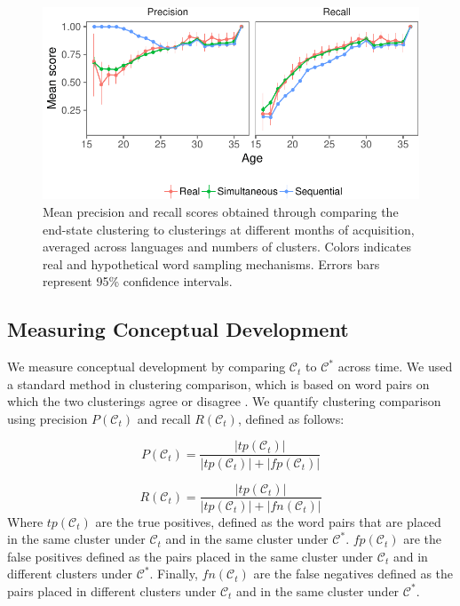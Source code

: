 \documentclass[11pt]{article}
\newenvironment{CodeChunk}{}{}
\begin{document}
\begin{CodeChunk}
\captionsetup{width=0.8\textwidth}\begin{figure}[h]

{\centering \includegraphics{figs/results-1} 

}

\caption[Mean precision and recall scores obtained through comparing the end-state clustering to clusterings at different months of acquisition, averaged across languages and numbers of clusters]{Mean precision and recall scores obtained through comparing the end-state clustering to clusterings at different months of acquisition, averaged across languages and numbers of clusters. Colors indicates real and hypothetical word sampling mechanisms. Errors bars represent 95\% confidence intervals.}\label{fig:results}
\end{figure}
\end{CodeChunk}

\subsection{Measuring Conceptual
Development}\label{measuring-conceptual-development}

We measure conceptual development by comparing \(\mathcal{C}_t\) to
\(\mathcal{C}^*\) across time. We used a standard method in clustering
comparison, which is based on word pairs on which the two clusterings
agree or disagree \cite{rand1971,hubert1985}. We quantify clustering
comparison using precision \(P(\mathcal{C}_t)\) and recall
\(R(\mathcal{C}_t)\), defined as follows:

\[
P(\mathcal{C}_t) = \frac{|tp(\mathcal{C}_t)|}{|tp(\mathcal{C}_t)| + |fp(\mathcal{C}_t)|}
\]

\[
R(\mathcal{C}_t) = \frac{|tp(\mathcal{C}_t)|}{|tp(\mathcal{C}_t)| + |fn(\mathcal{C}_t)|}
\] Where \(tp(\mathcal{C}_t)\) are the true positives, defined as the
word pairs that are placed in the same cluster under \(\mathcal{C}_t\)
and in the same cluster under \(\mathcal{C}^*\). \(fp(\mathcal{C}_t)\)
are the false positives defined as the pairs placed in the same cluster
under \(\mathcal{C}_t\) and in different clusters under
\(\mathcal{C}^*\). Finally, \(fn(\mathcal{C}_t)\) are the false
negatives defined as the pairs placed in different clusters under
\(\mathcal{C}_t\) and in the same cluster under \(\mathcal{C}^*\).
\end{document}
